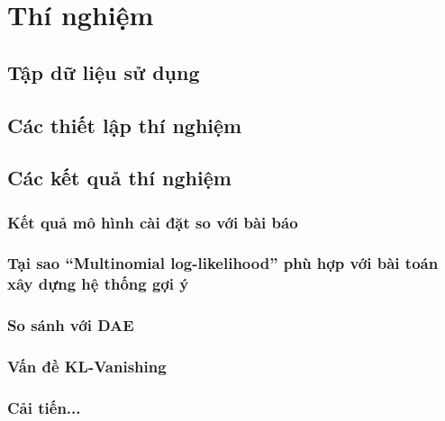 \chapter{Thí nghiệm}
\label{Chapter4}

\section{Tập dữ liệu sử dụng}
\section{Các thiết lập thí nghiệm}
\section{Các kết quả thí nghiệm}
    \subsection{Kết quả mô hình cài đặt so với bài báo}
    \subsection{Tại sao ``Multinomial log-likelihood'' phù hợp với bài toán xây dựng hệ thống gợi ý}
    \subsection{So sánh với DAE}
    \subsection{Vấn đề KL-Vanishing}
    \subsection{Cải tiến...}